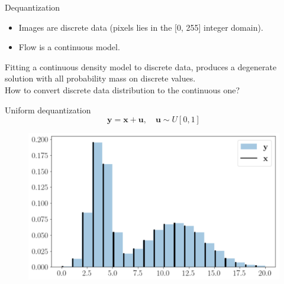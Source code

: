 \documentclass{beamer}
\newcommand{\bu}{\mathbf{u}}
\newcommand{\bx}{\mathbf{x}}
\newcommand{\by}{\mathbf{y}}
\begin{document}
\begin{frame}{Dequantization}
	\begin{itemize}
		\item Images are discrete data (pixels lies in the [0, 255] integer domain). 
		\item Flow is a continuous model.
	\end{itemize}
	Fitting a continuous density model to discrete data, produces a degenerate solution with all probability mass on discrete values. \\
	How to convert discrete data distribution to the continuous one?
	
	\begin{minipage}[t]{0.5\columnwidth}
		\begin{block}{Uniform dequantization}
			\[
			\by = \bx + \bu, \quad \bu \sim U[0, 1]
			\]
		\end{block}
	\end{minipage}%
	\begin{minipage}[t]{0.5\columnwidth}
		\begin{figure}
			\centering
			\includegraphics[width=1.0\linewidth]{figs/uniform_dequantization.png}
		\end{figure}
	\end{minipage}
\end{frame}
\end{document}
